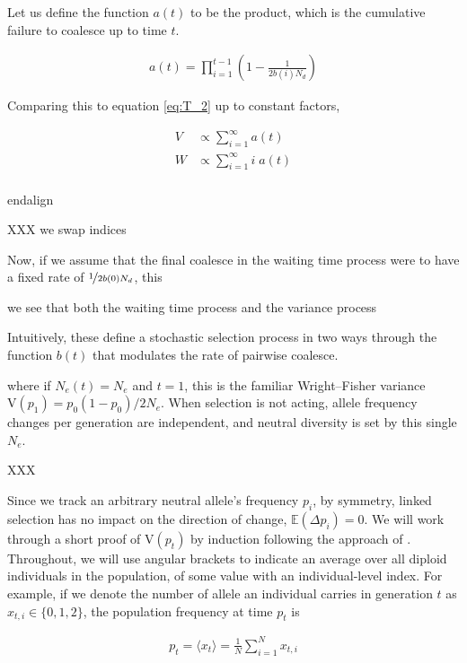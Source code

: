 \documentclass[11pt]{article}
\newcommand{\E}{\mathbb{E}}
\newcommand{\V}{\text{V}}
\begin{document}
Let us define the function $a(t)$ to be the product, which is the cumulative
failure to coalesce up to time $t$.

\begin{align}
  a(t) = \prod_{i=1}^{t-1} \left( 1-\frac{1}{2 b(i) N_d} \right)
\end{align}

Comparing this to equation \eqref{eq:T_2} up to constant factors, 

\begin{align}
  V &\propto \sum_{i=1}^\infty a(t) \\
  W &\propto \sum_{i=1}^\infty i \; a(t) \\
\end{align}

end{align}

XXX we swap indices

Now, if we assume that the final coalesce in the waiting time process were to
have a fixed rate of $\nicefrac{1}{2b(0)N_d}$, this 

we see that both the waiting time process and the variance process 

Intuitively, these define a stochastic selection process in two ways through
the function $b(t)$ that modulates the rate of pairwise coalesce. 







where if $N_e(t) = N_e$ and $t=1$, this is the familiar Wright--Fisher variance
$\V(p_1) = p_0(1-p_0) / 2N_e$. When selection is not acting, allele frequency
changes per generation are independent, and neutral diversity is set by this
single $N_e$. 

XXX

Since we track an arbitrary neutral allele's frequency $p_i$, by symmetry,
linked selection has no impact on the direction of change, $\E(\Delta p_i) =
0$. We will work through a short proof of $\V(p_t)$ by induction following the
approach of \textcite{Santiago1995-hx}. Throughout, we will use angular
brackets to indicate an average over all diploid individuals in the population,
of some value with an individual-level index. For example, if we denote the
number of allele an individual carries in generation $t$ as $x_{t,i} \in \{0,
1, 2\}$, the population frequency at time $p_t$ is

\begin{align}
  p_t = \langle x_t \rangle = \frac{1}{N} \sum_{i=1}^N x_{t,i}
\end{align}
\end{document}
